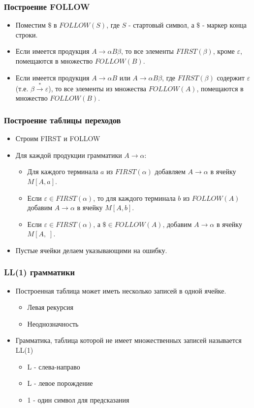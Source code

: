 \documentclass[16pt,pdf,unicode]{beamer}
\begin{document}
\begin{frame}
\frametitle{Построение FOLLOW}
\begin{itemize}
  \item Поместим $\$$ в $FOLLOW(S)$, где $S$ - стартовый символ, а $\$$ - маркер конца строки.
  \item Если имеется продукция $A \rightarrow \alpha B \beta$, то все элементы $FIRST(\beta)$, кроме $\varepsilon$, помещаются в множество $FOLLOW(B)$.
  \item Если имеется продукция $A \rightarrow \alpha  B$ или $A \rightarrow \alpha B \beta$, где $FIRST(\beta)$ содержит $\varepsilon$(т.е. $\beta \xrightarrow{*}\varepsilon$), то все элементы из множества $FOLLOW(A)$, помещаются в множество $FOLLOW(B)$.
\end{itemize}
\end{frame}

\begin{frame}
\frametitle{Построение таблицы переходов}
\begin{itemize}
  \item Строим FIRST и FOLLOW
  \item Для каждой продукции грамматики $A \rightarrow \alpha$:
    \begin{itemize}
      \item Для каждого терминала $a$ из $FIRST(\alpha)$ добавляем $A \rightarrow \alpha$ в ячейку $M[A,a]$.
      \item Если $\varepsilon \in FIRST(\alpha)$, то для каждого терминала $b$ из $FOLLOW(A)$ добавим $A \rightarrow \alpha$ в ячейку $M[A,b]$.
      \item Если $\varepsilon \in FIRST(\alpha)$, а $\$ \in FOLLOW(A)$, добавим $A \rightarrow \alpha$ в ячейку $M[A,\;]$. 
    \end{itemize}
  \item Пустые ячейки делаем указывающими на ошибку.
\end{itemize}
\end{frame}

\begin{frame}
\frametitle{LL(1) грамматики}
\begin{itemize}
  \item Построенная таблица может иметь несколько записей в одной ячейке.
    \begin{itemize}
      \item Левая рекурсия
      \item Неоднозначность
    \end{itemize}
  \item Грамматика, таблица которой не имеет множественных записей называется LL(1)
    \begin{itemize}
      \item L - слева-направо
      \item L - левое порождение
      \item 1 - один символ для предсказания
    \end{itemize}
\end{itemize}
\end{frame}
\end{document}
